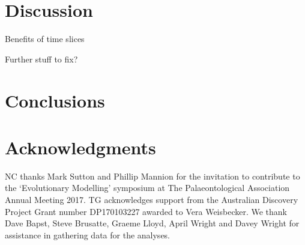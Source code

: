 \documentclass[12pt,a4paper]{article}
\begin{document}
\section{Discussion}

Benefits of time slices

Further stuff to fix?



\section{Conclusions}
	

\section{Acknowledgments}
	NC thanks Mark Sutton and Phillip Mannion for the invitation to contribute to the `Evolutionary Modelling' symposium at The Palaeontological Association Annual Meeting 2017.
  TG acknowledges support from the Australian Discovery Project Grant number DP170103227 awarded to Vera Weisbecker.
  We thank Dave Bapst, Steve Brusatte, Graeme Lloyd, April Wright and Davey Wright for assistance in gathering data for the analyses.
	
 
 
\end{document}
